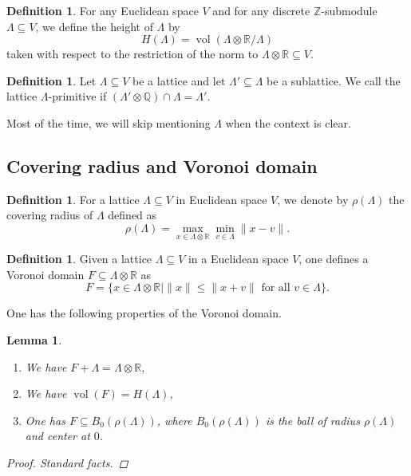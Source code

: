 \documentclass{amsart}
\newtheorem{lemma}[theorem]{Lemma}
\theoremstyle{definition}
\newtheorem{definition}[theorem]{Definition}
\theoremstyle{remark}
\DeclareMathOperator{\vol}{vol}
\begin{document}
\begin{definition}
    \label{de:height_definition}
    For any Euclidean space $V$ and for any discrete $\mathbb{Z}$-submodule $\Lambda \subseteq V$, we define the height 
    of $\Lambda$ by
    \begin{equation}
        H(\Lambda)  = \vol(\Lambda \otimes \mathbb{R} /\Lambda)
    \end{equation}
    taken with respect to the restriction of the norm to $ \Lambda \otimes \mathbb{R} \subseteq V$. 
\end{definition}


\begin{definition}
    \label{de:primitive}
    Let $\Lambda \subseteq V$ be a lattice and let $\Lambda' \subseteq \Lambda$ be a sublattice.
    We call the lattice $\Lambda$-primitive if $(\Lambda' \otimes \mathbb{Q}) \cap \Lambda = \Lambda'$.

    Most of the time, we will skip mentioning $\Lambda$ when the context is clear.
\end{definition}

\subsection{Covering radius and Voronoi domain}

\begin{definition}
    For a lattice $\Lambda \subseteq V$ in Euclidean space $V$, we denote by $\rho(\Lambda)$ the covering radius of $\Lambda$ defined as 
    \begin{equation}
        \rho(\Lambda) = \max_{x \in {\Lambda \otimes \mathbb{R}}} \min _{v \in \Lambda} \|x-v\|.
    \end{equation}
\end{definition}

\begin{definition}
    Given a lattice $\Lambda \subseteq V$ in a Euclidean space $V$, one defines a Voronoi domain $F \subseteq \Lambda \otimes \mathbb{R}$ as
    \begin{equation}
        F = \{ x \in \Lambda \otimes \mathbb{R} \mid \|x\| \leq \|x + v\| \text{ for all } v \in \Lambda\}.
    \end{equation}
\end{definition}
One has the following properties of the Voronoi domain.
\begin{lemma}
    \label{le:voronoi}
    \begin{enumerate}

        \item  We have $F + \Lambda = \Lambda \otimes \mathbb{R}$,
        \item We have $\vol(F) = H(\Lambda)$,
        \item  One has $F \subseteq B_{0}(\rho(\Lambda))$, where $B_{0}(\rho(\Lambda))$ is the ball of radius $\rho(\Lambda)$ and center at $0$.
    \end{enumerate}
    \begin{proof}
        Standard facts.
    \end{proof}

\end{lemma}
\end{document}
